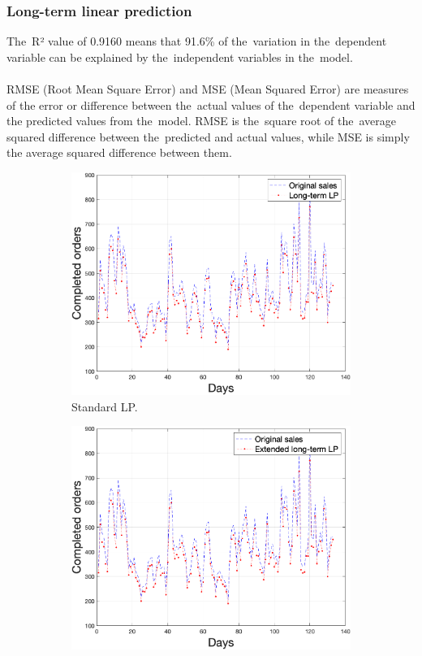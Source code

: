     \subsubsection{Long-term linear prediction} \label{subsec:res_ltlp}
    The~R² value of 0.9160 means that 91.6\% of the~variation in the~dependent
    variable can be explained by the~independent variables in the~model.\\
    \\
    RMSE (Root Mean Square Error) and MSE (Mean Squared Error) are measures of the
    error or difference between the~actual values of the~dependent variable and the
    predicted values from the~model. RMSE is the~square root of the~average squared
    difference between the~predicted and actual values, while MSE is simply the
    average squared difference between them.
    \begin{figure}[h!]
        \centering
        \begin{subfigure}[b]{0.6\textwidth}
            \includegraphics[width=1\textwidth]{figures/expLTLP.png}
            \caption{Standard LP.}
            \label{fig:ltlp}
        \end{subfigure}
        \begin{subfigure}[b]{0.6\textwidth}
            \includegraphics[width=1\textwidth]{figures/expELTLP.png}

\end{subfigure}
\end{figure}
